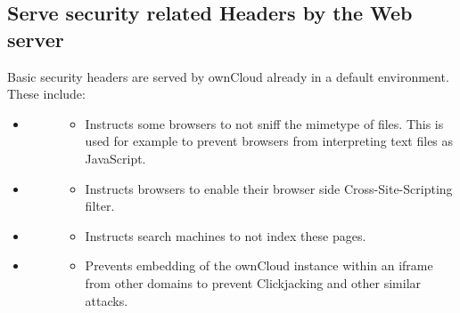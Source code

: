 \documentclass[letterpaper,10pt,english]{sphinxmanual}
\begin{document}
\subsection{Serve security related Headers by the Web server}
\label{configuration_server/harden_server:serve-security-related-headers-by-the-web-server}
Basic security headers are served by ownCloud already in a default environment.
These include:
\begin{itemize}
\item {} \begin{description}
\item[{}] \leavevmode\begin{itemize}
\item {} 
Instructs some browsers to not sniff the mimetype of files. This is used for example to prevent browsers from interpreting text files as JavaScript.

\end{itemize}

\end{description}

\item {} \begin{description}
\item[{}] \leavevmode\begin{itemize}
\item {} 
Instructs browsers to enable their browser side Cross-Site-Scripting filter.

\end{itemize}

\end{description}

\item {} \begin{description}
\item[{}] \leavevmode\begin{itemize}
\item {} 
Instructs search machines to not index these pages.

\end{itemize}

\end{description}

\item {} \begin{description}
\item[{}] \leavevmode\begin{itemize}
\item {} 
Prevents embedding of the ownCloud instance within an iframe from other domains to prevent Clickjacking and other similar attacks.

\end{itemize}

\end{description}

\end{itemize}
\end{document}
